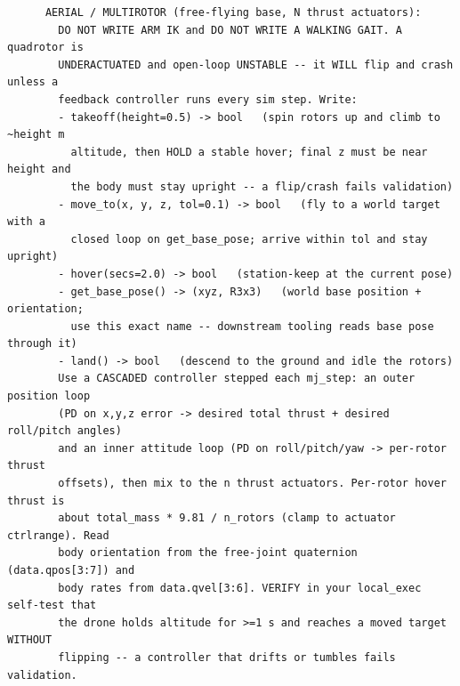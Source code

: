 {\begin{verbatim}
      AERIAL / MULTIROTOR (free-flying base, N thrust actuators):
        DO NOT WRITE ARM IK and DO NOT WRITE A WALKING GAIT. A quadrotor is
        UNDERACTUATED and open-loop UNSTABLE -- it WILL flip and crash unless a
        feedback controller runs every sim step. Write:
        - takeoff(height=0.5) -> bool   (spin rotors up and climb to ~height m
          altitude, then HOLD a stable hover; final z must be near height and
          the body must stay upright -- a flip/crash fails validation)
        - move_to(x, y, z, tol=0.1) -> bool   (fly to a world target with a
          closed loop on get_base_pose; arrive within tol and stay upright)
        - hover(secs=2.0) -> bool   (station-keep at the current pose)
        - get_base_pose() -> (xyz, R3x3)   (world base position + orientation;
          use this exact name -- downstream tooling reads base pose through it)
        - land() -> bool   (descend to the ground and idle the rotors)
        Use a CASCADED controller stepped each mj_step: an outer position loop
        (PD on x,y,z error -> desired total thrust + desired roll/pitch angles)
        and an inner attitude loop (PD on roll/pitch/yaw -> per-rotor thrust
        offsets), then mix to the n thrust actuators. Per-rotor hover thrust is
        about total_mass * 9.81 / n_rotors (clamp to actuator ctrlrange). Read
        body orientation from the free-joint quaternion (data.qpos[3:7]) and
        body rates from data.qvel[3:6]. VERIFY in your local_exec self-test that
        the drone holds altitude for >=1 s and reaches a moved target WITHOUT
        flipping -- a controller that drifts or tumbles fails validation.


\end{verbatim}}

